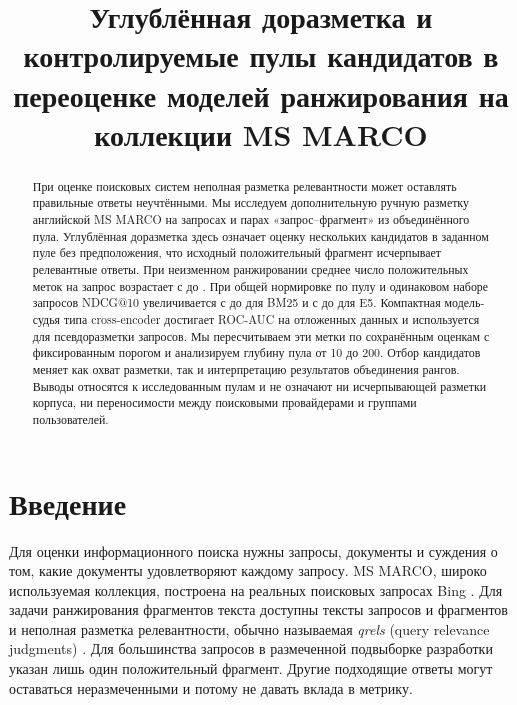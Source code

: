 \documentclass[runningheads,a4paper]{llncs}
\title{Углублённая доразметка и контролируемые пулы кандидатов в переоценке моделей ранжирования на коллекции MS MARCO}
\author{}
\institute{}
\begin{document}
\maketitle
\begin{abstract}
При оценке поисковых систем неполная разметка релевантности может оставлять правильные ответы неучтёнными. Мы исследуем дополнительную ручную разметку английской MS MARCO на \ManualQueryCount{} запросах и \ManualPairCount{} парах «запрос--фрагмент» из объединённого пула. Углублённая доразметка здесь означает оценку нескольких кандидатов в заданном пуле без предположения, что исходный положительный фрагмент исчерпывает релевантные ответы. При неизменном ранжировании среднее число положительных меток на запрос возрастает с \OriginalMeanRel{} до \HumanMeanRel{}. При общей нормировке по пулу и одинаковом наборе запросов NDCG@10 увеличивается с \BmOriginal{} до \BmHuman{} для BM25 и с \EOriginal{} до \EHuman{} для E5. Компактная модель-судья типа cross-encoder достигает ROC-AUC \JudgeTestAuc{} на отложенных данных и используется для псевдоразметки \FullQueryCount{} запросов. Мы пересчитываем эти метки по сохранённым оценкам с фиксированным порогом и анализируем глубину пула от 10 до 200. Отбор кандидатов меняет как охват разметки, так и интерпретацию результатов объединения рангов. Выводы относятся к исследованным пулам и не означают ни исчерпывающей разметки корпуса, ни переносимости между поисковыми провайдерами и группами пользователей.
\end{abstract}

\section{Введение}
\label{sec:intro}

Для оценки информационного поиска нужны запросы, документы и суждения о том, какие документы удовлетворяют каждому запросу. MS MARCO, широко используемая коллекция, построена на реальных поисковых запросах Bing \cite{bajaj2016msmarco}. Для задачи ранжирования фрагментов текста доступны тексты запросов и фрагментов и неполная разметка релевантности, обычно называемая \emph{qrels} (query relevance judgments) \cite{msmarco_datasets}. Для большинства запросов в размеченной подвыборке разработки указан лишь один положительный фрагмент. Другие подходящие ответы могут оставаться неразмеченными и потому не давать вклада в метрику.
\end{document}
